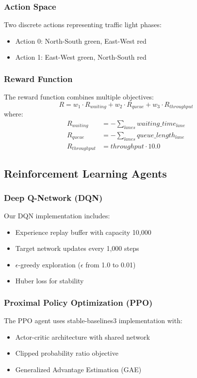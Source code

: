 \documentclass[conference]{IEEEtran}
\begin{document}
\subsubsection{Action Space}
Two discrete actions representing traffic light phases:
\begin{itemize}
\item Action 0: North-South green, East-West red
\item Action 1: East-West green, North-South red
\end{itemize}

\subsubsection{Reward Function}
The reward function combines multiple objectives:
\begin{equation}
R = w_1 \cdot R_{waiting} + w_2 \cdot R_{queue} + w_3 \cdot R_{throughput}
\end{equation}
where:
\begin{align}
R_{waiting} &= -\sum_{lanes} waiting\_time_{lane} \\
R_{queue} &= -\sum_{lanes} queue\_length_{lane} \\
R_{throughput} &= throughput \cdot 10.0
\end{align}

\subsection{Reinforcement Learning Agents}

\subsubsection{Deep Q-Network (DQN)}
Our DQN implementation includes:
\begin{itemize}
\item Experience replay buffer with capacity 10,000
\item Target network updates every 1,000 steps
\item $\epsilon$-greedy exploration ($\epsilon$ from 1.0 to 0.01)
\item Huber loss for stability
\end{itemize}

\subsubsection{Proximal Policy Optimization (PPO)}
The PPO agent uses stable-baselines3 implementation with:
\begin{itemize}
\item Actor-critic architecture with shared network
\item Clipped probability ratio objective
\item Generalized Advantage Estimation (GAE)
\end{itemize}
\end{document}
